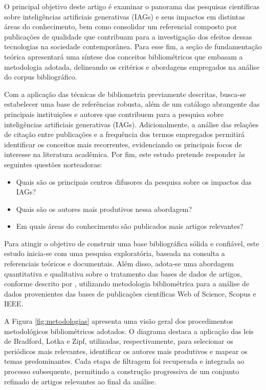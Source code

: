 \documentclass[openany,oneside,a4paper,11pt]{extarticle}
\begin{document}
O principal objetivo deste artigo é examinar o panorama das pesquisas científicas sobre inteligências artificiais generativas (IAGs) e seus impactos em distintas áreas do conhecimento, bem como consolidar um referencial composto por publicações de qualidade que contribuam para a investigação dos efeitos dessas tecnologias na sociedade contemporânea. Para esse fim, a seção de fundamentação teórica apresentará uma síntese dos conceitos bibliométricos que embasam a metodologia adotada, delineando os critérios e abordagens empregados na análise do corpus bibliográfico.

Com a aplicação das técnicas de bibliometria previamente descritas, busca-se estabelecer uma base de referências robusta, além de um catálogo abrangente das principais instituições e autores que contribuem para a pesquisa sobre inteligências artificiais generativas (IAGs). Adicionalmente, a análise das relações de citação entre publicações e a frequência dos termos empregados permitirá identificar os conceitos mais recorrentes, evidenciando os principais focos de interesse na literatura acadêmica. Por fim, este estudo pretende responder às seguintes questões norteadoras:

\begin{itemize}
    \item Quais são os principais centros difusores da pesquisa sobre os impactos das IAGs?
    \item Quais são os autores mais produtivos nessa abordagem?
    \item Em quais áreas do conhecimento são publicados mais artigos relevantes?
\end{itemize}

Para atingir o objetivo de construir uma base bibliográfica sólida e confiável, este estudo inicia-se com uma pesquisa exploratória, baseada na consulta a referenciais teóricos e documentais. Além disso, adota-se uma abordagem quantitativa e qualitativa sobre o tratamento das bases de dados de artigos, conforme descrito por \textcite{carlosHenrique2010Metodologia, gil2002elaborar}, utilizando metodologia bibliométrica para a análise de dados provenientes das bases de publicações científicas Web of Science, Scopus e IEEE. 

A Figura \ref{fig:metodologias} apresenta uma visão geral dos procedimentos metodológicos bibliométricos adotados. O diagrama destaca a aplicação das leis de Bradford, Lotka e Zipf, utilizadas, respectivamente, para selecionar os periódicos mais relevantes, identificar os autores mais produtivos e mapear os temas predominantes. Cada etapa de filtragem foi recuperada e integrada ao processo subsequente, permitindo a construção progressiva de um conjunto refinado de artigos relevantes ao final da análise.
\end{document}
